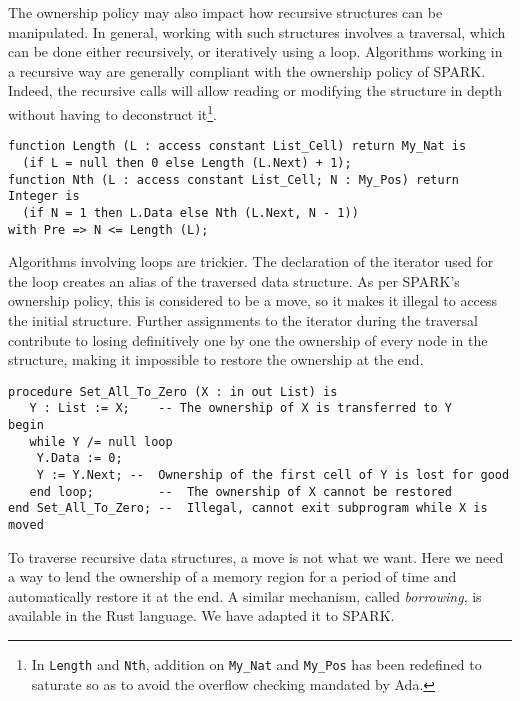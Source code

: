 \documentclass[runningheads]{llncs}
\begin{document}
The ownership policy may also impact how recursive structures can be manipulated. In general, working with such structures involves a traversal, which can be done either recursively, or iteratively using a loop. Algorithms working in a recursive way are generally compliant with the ownership policy of SPARK. Indeed, the recursive calls will allow reading or modifying the structure in depth without having to deconstruct it\footnote{In \texttt{Length} and \texttt{Nth}, addition on \texttt{My\_Nat} and \texttt{My\_Pos} has been redefined to saturate so as to avoid the overflow checking mandated by Ada.}.
\begin{lstlisting}
function Length (L : access constant List_Cell) return My_Nat is
  (if L = null then 0 else Length (L.Next) + 1);
function Nth (L : access constant List_Cell; N : My_Pos) return Integer is
  (if N = 1 then L.Data else Nth (L.Next, N - 1))
with Pre => N <= Length (L);
\end{lstlisting}
Algorithms involving loops are trickier. The declaration of the iterator used for the loop creates an alias of the traversed data structure. As per SPARK's ownership policy, this is considered to be a move, so it makes it illegal to access the initial structure. Further assignments to the iterator during the traversal contribute to losing definitively one by one the ownership of every node in the structure, making it impossible to restore the ownership at the end.
\begin{lstlisting}
procedure Set_All_To_Zero (X : in out List) is
   Y : List := X;    -- The ownership of X is transferred to Y
begin
   while Y /= null loop
  	Y.Data := 0;
  	Y := Y.Next; --  Ownership of the first cell of Y is lost for good
   end loop;         --  The ownership of X cannot be restored
end Set_All_To_Zero; --  Illegal, cannot exit subprogram while X is moved
\end{lstlisting}
To traverse recursive data structures, a move is not what we want. Here we need a way to lend the ownership of a memory region for a period of time and automatically restore it at the end. A similar mechanism, called \emph{borrowing}, is available in the Rust language. We have adapted it to SPARK.
\end{document}

